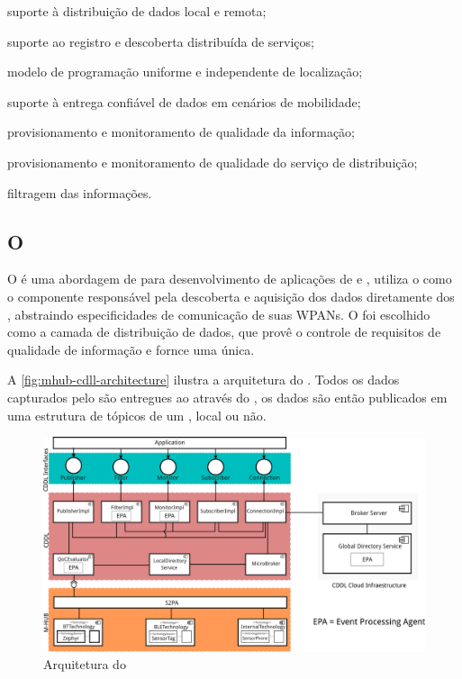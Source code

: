 \begin{alineas}
	\item suporte à distribuição de dados local e remota;

	\item suporte ao registro e descoberta distribuída de serviços;

	\item modelo de programação uniforme e independente de localização;

	\item suporte à entrega confiável de dados em cenários de mobilidade;

	\item provisionamento e monitoramento de qualidade da informação;

	\item provisionamento e monitoramento de qualidade do serviço de distribuição;

	\item filtragem das informações.
\end{alineas}

\subsection*{O \middleware \mhubcddl}

O \mhubcddl é uma abordagem de \middleware para desenvolvimento de aplicações de \iomt e \iot, utiliza o \mhub como o componente responsável pela descoberta e aquisição dos dados diretamente dos \smartobjs, abstraindo especificidades de comunicação de suas WPANs. O \cddl foi escolhido como a camada de distribuição de dados, que provê o controle de requisitos de qualidade de informação e fornce uma \api única.

A \autoref{fig:mhub-cdll-architecture} ilustra a arquitetura do \middleware. Todos os dados capturados pelo \mhub são entregues ao \cddl através do \stwopa, os dados são então publicados em uma estrutura de tópicos de um \broker \mqtt, local ou não.

\begin{figure}[htb]
	\centering
	\caption{\label{fig:mhub-cdll-architecture}Arquitetura do \mhubcddl}
	\includegraphics[width=0.85\linewidth]{img/mhub-cddl-architecture.png}
\end{figure}


